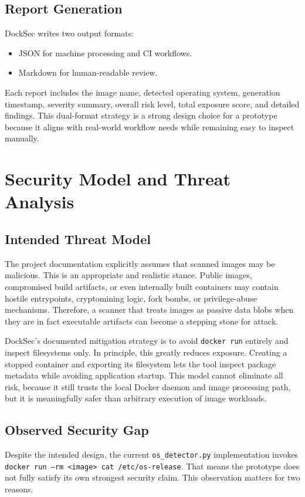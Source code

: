 \documentclass[12pt,draftclsnofoot,onecolumn]{IEEEtran}
\begin{document}
\subsection{Report Generation}
DockSec writes two output formats:
\begin{itemize}
  \item JSON for machine processing and CI workflows.
  \item Markdown for human-readable review.
\end{itemize}

Each report includes the image name, detected operating system, generation timestamp, severity summary, overall risk level, total exposure score, and detailed findings. This dual-format strategy is a strong design choice for a prototype because it aligns with real-world workflow needs while remaining easy to inspect manually.

\section{Security Model and Threat Analysis}
\subsection{Intended Threat Model}
The project documentation explicitly assumes that scanned images may be malicious. This is an appropriate and realistic stance. Public images, compromised build artifacts, or even internally built containers may contain hostile entrypoints, cryptomining logic, fork bombs, or privilege-abuse mechanisms. Therefore, a scanner that treats images as passive data blobs when they are in fact executable artifacts can become a stepping stone for attack.

DockSec's documented mitigation strategy is to avoid \texttt{docker run} entirely and inspect filesystems only. In principle, this greatly reduces exposure. Creating a stopped container and exporting its filesystem lets the tool inspect package metadata while avoiding application startup. This model cannot eliminate all risk, because it still trusts the local Docker daemon and image processing path, but it is meaningfully safer than arbitrary execution of image workloads.

\subsection{Observed Security Gap}
Despite the intended design, the current \texttt{os\_detector.py} implementation invokes \texttt{docker run --rm <image> cat /etc/os-release}. That means the prototype does not fully satisfy its own strongest security claim. This observation matters for two reasons.
\end{document}
